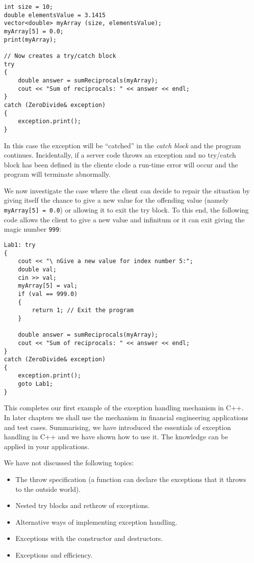 \begin{lstlisting}
int size = 10;
double elementsValue = 3.1415
vector<double> myArray (size, elementsValue);
myArray[5] = 0.0;
print(myArray);

// Now creates a try/catch block
try
{
	double answer = sumReciprocals(myArray);
	cout << "Sum of reciprocals: " << answer << endl;
}
catch (ZeroDivide& exception)
{
	exception.print();
}
\end{lstlisting}
In this case the exception will be ``catched'' in the \emph{catch block} and the program continues. Incidentally, if a server code throws an exception and no try/catch block has been defined in the cliente clode a run-time error will occur and the program will terminate abnormally.

We now investigate the case where the client can decide to repair the situation by giving itself the chance to give a new value for the offending value (namely \texttt{myArray[5] = 0.0}) or allowing it to exit the try block. To this end, the following code allows the client to give a new value and infinitum or it can exit giving the magic number \texttt{999}:
\begin{lstlisting}
Lab1: try
{
	cout << "\ nGive a new value for index number 5:";
	double val;
	cin >> val;
	myArray[5] = val;
	if (val == 999.0)
	{
		return 1; // Exit the program
	}

	double answer = sumReciprocals(myArray);
	cout << "Sum of reciprocals: " << answer << endl;
}
catch (ZeroDivide& exception)
{
	exception.print();
	goto Lab1;
}
\end{lstlisting}
This completes our first example of the exception handling mechanism in C++. In later chapters we shall use the mechanism in financial engineering applications and test cases. Summarising, we have introduced the essentials of exception handling in C++ and we have shown how to use it. The knowledge can be applied in your applications.

We have not discussed the following topics:
\begin{itemize}
	\item The throw specification (a function can declare the exceptions that it throws to the outside world).
	\item Nested try blocks and rethrow of exceptions.
	\item Alternative ways of implementing exception handling.
	\item Exceptions with the constructor and destructors.
	\item Exceptions and efficiency.
\end{itemize}

